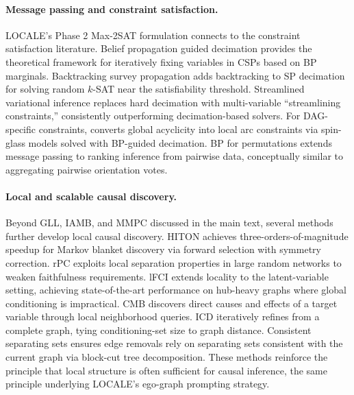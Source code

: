 \documentclass{article}
\begin{document}
\paragraph{Message passing and constraint satisfaction.}
LOCALE's Phase 2 Max-2SAT formulation connects to the constraint satisfaction literature. Belief propagation guided decimation \citep{ricctersenghi2009cavity} provides the theoretical framework for iteratively fixing variables in CSPs based on BP marginals. Backtracking survey propagation \citep{marino2016backtracking} adds backtracking to SP decimation for solving random $k$-SAT near the satisfiability threshold. Streamlined variational inference \citep{grover2018streamline} replaces hard decimation with multi-variable ``streamlining constraints,'' consistently outperforming decimation-based solvers. For DAG-specific constraints, \citet{zhou2016spinglass} converts global acyclicity into local arc constraints via spin-glass models solved with BP-guided decimation. BP for permutations \citep{cantwell2022bpperm} extends message passing to ranking inference from pairwise data, conceptually similar to aggregating pairwise orientation votes.

\paragraph{Local and scalable causal discovery.}
Beyond GLL, IAMB, and MMPC discussed in the main text, several methods further develop local causal discovery. HITON \citep{aliferis2003hiton} achieves three-orders-of-magnitude speedup for Markov blanket discovery via forward selection with symmetry correction. rPC \citep{sondhi2019rpc} exploits local separation properties in large random networks to weaken faithfulness requirements. lFCI \citep{chen2023lfci} extends locality to the latent-variable setting, achieving state-of-the-art performance on hub-heavy graphs where global conditioning is impractical. CMB \citep{gao2015cmb} discovers direct causes and effects of a target variable through local neighborhood queries. ICD \citep{rohekar2021icd} iteratively refines from a complete graph, tying conditioning-set size to graph distance. Consistent separating sets \citep{li2019consistent} ensures edge removals rely on separating sets consistent with the current graph via block-cut tree decomposition. These methods reinforce the principle that local structure is often sufficient for causal inference, the same principle underlying LOCALE's ego-graph prompting strategy.
\end{document}
